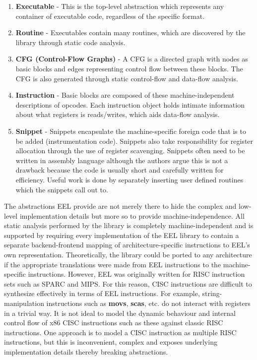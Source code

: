\begin{enumerate}
 \item \textbf{Executable} - This is the top-level abstraction which represents any container of executable code, regardless of the specific format.
 \item \textbf{Routine} - Executables contain many routines, which are discovered by the library through static code analysis.
 \item \textbf{CFG (Control-Flow Graphs)} - A CFG is a directed graph with nodes as basic blocks and edges representing control flow between these blocks. The CFG is also generated through static control-flow and data-flow analysis.
 \item \textbf{Instruction} - Basic blocks are composed of these machine-independent descriptions of opcodes. Each instruction object holds intimate information about what registers is reads/writes, which aids data-flow analysis.
 \item \textbf{Snippet} - Snippets encapsulate the machine-specific foreign code that is to be added (instrumentation code). Snippets also take responsibility for register allocation through the use of register scavenging. Snippets often need to be written in assembly language although the authors argue this is not a drawback because the code is usually short and carefully written for efficiency. Useful work is done by separately inserting user defined routines which the snippets call out to.
\end{enumerate}

The abstractions EEL provide are not merely there to hide the complex and low-level implementation details but more so to provide machine-independence. All static analysis performed by the library is completely machine-independent and is supported by requiring every implementation of the EEL library to contain a separate backend-frontend mapping of architecture-specific instructions to EEL's own representation. Theoretically, the library could be ported to any architecture if the appropriate translations were made from EEL instructions to the machine-specific instructions. However, EEL was originally written for RISC instruction sets such as SPARC and MIPS. For this reason, CISC instructions are difficult to synthesize effectively in terms of EEL instructions. For example, string-manipulation instructions such as \textbf{movs}, \textbf{scas}, etc. do not interact with registers in a trivial way. It is not ideal to model the dynamic behaviour and internal control flow of x86 CISC instructions such as these against classic RISC instructions. One approach is to model a CISC instruction as multiple RISC instructions\cite{intermodule_code_optimization}, but this is inconvenient, complex and exposes underlying implementation details thereby breaking abstractions.

